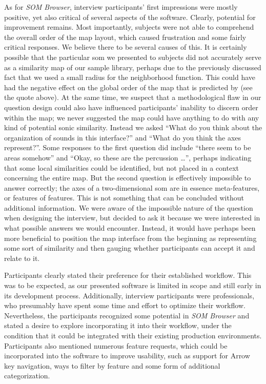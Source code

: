 As for \textit{SOM Browser}, interview participants' first impressions were
mostly positive, yet also critical of several aspects of the software. Clearly,
potential for improvement remains. Most importantly, subjects were not able to
comprehend the overall order of the map layout, which caused frustration and
some fairly critical responses. We believe there to be several causes of this.
It is certainly possible that the particular \gls{som} we presented to subjects
did not accurately serve as a similarity map of our sample library, perhaps due
to the previously discussed fact that we used a small radius for the
neighborhood function. This could have had the negative effect on the global
order of the map that is predicted by \citet{kohonen1990} (see the quote above).
At the same time, we suspect that a methodological flaw in our question design
could also have influenced participants' inability to discern order within the
map; we never suggested the map could have anything to do with any kind of
potential sonic similarity. Instead we asked ``What do you think about the
organization of sounds in this interface?'' and ``What do you think the axes
represent?''. Some responses to the first question did include ``there seem to
be areas somehow'' and ``Okay, so these are the percussion \dots'', perhaps
indicating that some local similarities could be identified, but not placed in a
context concerning the entire map. But the second question is effectively
impossible to answer correctly; the axes of a two-dimensional \gls{som} are in
essence meta-features, or features of features. This is not something that can
be concluded without additional information. We were aware of the impossible
nature of the question when designing the interview, but decided to ask it
because we were interested in what possible answers we would encounter. Instead,
it would have perhaps been more beneficial to position the map interface from
the beginning as representing some sort of similarity and then gauging whether
participants can accept it and relate to it.

\smallskip

Participants clearly stated their preference for their established workflow.
This was to be expected, as our presented software is limited in scope and still
early in its development process. Additionally, interview participants were
professionals, who presumably have spent some time and effort to optimize their
workflow. Nevertheless, the participants recognized some potential in
\textit{SOM Browser} and stated a desire to explore incorporating it into their
workflow, under the condition that it could be integrated with their existing
production environments. Participants also mentioned numerous feature requests,
which could be incorporated into the software to improve usability, such as
support for Arrow key navigation, ways to filter by feature and some form of
additional categorization.

